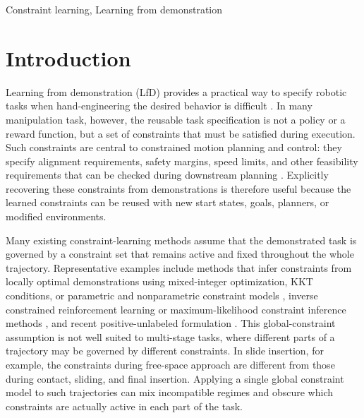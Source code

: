 \documentclass[lettersize,journal]{IEEEtran}
\begin{document}
\begin{IEEEkeywords}
Constraint learning, Learning from demonstration
\end{IEEEkeywords}

\section{Introduction}
\label{sec:introduction}

Learning from demonstration (LfD) provides a practical way to specify robotic tasks when hand-engineering the desired behavior is difficult \cite{argall2009survey}. In many manipulation task, however, the reusable task specification is not a policy or a reward function, but a set of constraints that must be satisfied during execution. Such constraints are central to constrained motion planning and control: they specify alignment requirements, safety margins, speed limits, and other feasibility requirements that can be checked during downstream planning \cite{berenson2011task,kingston2018sampling}. Explicitly recovering these constraints from demonstrations is therefore useful because the learned constraints can be reused with new start states, goals, planners, or modified environments.

Many existing constraint-learning methods assume that the demonstrated task is governed by a constraint set that remains active and fixed throughout the whole trajectory. Representative examples include methods that infer constraints from locally optimal demonstrations using mixed-integer optimization, KKT conditions, or parametric and nonparametric constraint models \cite{chou2020local,chou2020parametric,chou2022gp}, inverse constrained reinforcement learning or maximum-likelihood constraint inference methods \cite{scobee2020maximum,malik2021inverse,liu2023benchmarking}, and recent positive-unlabeled formulation \cite{peng2025pucl}. This global-constraint assumption is not well suited to multi-stage tasks, where different parts of a trajectory may be governed by different constraints. In slide insertion, for example, the constraints during free-space approach are different from those during contact, sliding, and final insertion. Applying a single global constraint model to such trajectories can mix incompatible regimes and obscure which constraints are actually active in each part of the task.
\end{document}
